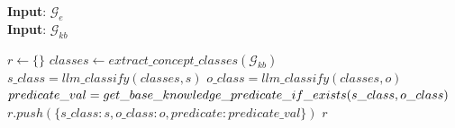 \documentclass{article}
\begin{document}
\begin{algorithm}[H]
\caption{Knowledge triples alignment to base knowledge schema}\label{algo:align}
\hspace*{\algorithmicindent} \textbf{Input}: $ \mathcal{G}_e $  \\
\hspace*{\algorithmicindent} \textbf{Input}: $ \mathcal{G}_{kb} $ 
\begin{algorithmic}[1]
\State $r\gets \{\}$
\State $classes \gets extract\_concept\_classes(\mathcal{G}_{kb})$
\State  $ s\_class = llm\_classify(classes,  s)$
\State  $ o\_class = llm\_classify(classes,  o)$
\State  $ predicate\_val =  \newline get\_base\_knowledge\_predicate\_if\_exists(s\_class, o\_class)$
\State $r.push(\{s\_class: s, o\_class: o, predicate: predicate\_val \})$
\EndFor
\State \Return $r$
\EndProcedure
\end{algorithmic}
\end{algorithm}
\end{document}
